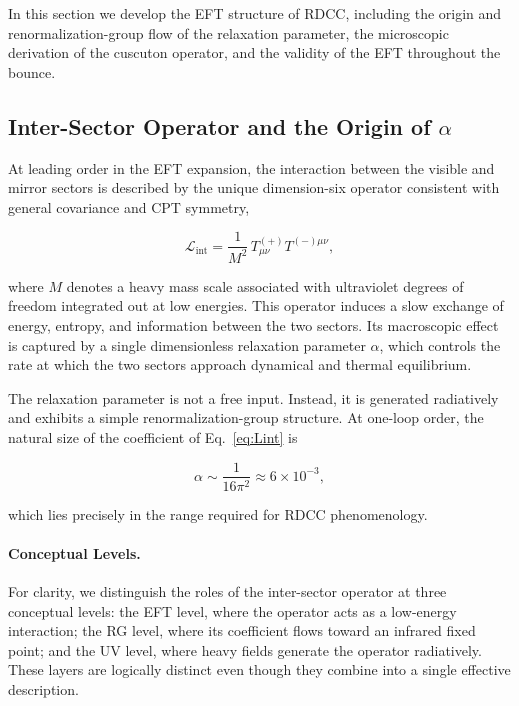 \documentclass[11pt,a4paper]{article}
\begin{document}
In this section we develop the EFT structure of RDCC, including the origin and
renormalization-group flow of the relaxation parameter, the microscopic
derivation of the cuscuton operator, and the validity of the EFT throughout the
bounce.

\subsection{Inter-Sector Operator and the Origin of \texorpdfstring{$\alpha$}{alpha}}

At leading order in the EFT expansion, the interaction between the visible and
mirror sectors is described by the unique dimension-six operator consistent with
general covariance and CPT symmetry,

\begin{equation}
\mathcal{L}_{\mathrm{int}}
    = \frac{1}{M^{2}}\,
      T^{(+)}_{\mu\nu} T^{(-)\mu\nu},
\label{eq:Lint}
\end{equation}

where \(M\) denotes a heavy mass scale associated with ultraviolet degrees of
freedom integrated out at low energies. This operator induces a slow exchange of
energy, entropy, and information between the two sectors. Its macroscopic effect
is captured by a single dimensionless relaxation parameter \(\alpha\), which
controls the rate at which the two sectors approach dynamical and thermal
equilibrium.

The relaxation parameter is not a free input. Instead, it is generated
radiatively and exhibits a simple renormalization-group structure. At one-loop
order, the natural size of the coefficient of Eq.~\eqref{eq:Lint} is

\begin{equation}
\alpha \sim \frac{1}{16\pi^{2}} \approx 6 \times 10^{-3},
\end{equation}

which lies precisely in the range required for RDCC phenomenology.


\paragraph{Conceptual Levels.}
For clarity, we distinguish the roles of the inter-sector operator at three conceptual levels:
the EFT level, where the operator acts as a low-energy interaction;
the RG level, where its coefficient flows toward an infrared fixed point;
and the UV level, where heavy fields generate the operator radiatively.
These layers are logically distinct even though they combine into a single effective description.
\end{document}

